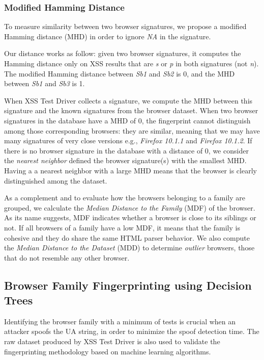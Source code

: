 \documentclass[10pt]{IEEEtran}
\begin{document}
\subsubsection{Modified Hamming Distance}


To measure similarity between two browser signatures, we propose a modified Hamming distance (MHD) 
in order to ignore \emph{NA} in the signature. 




Our distance works as follow: given two browser signatures, it computes the Hamming distance only on XSS results that are \emph{s} or \emph{p} in both signatures (not \emph{n}).
The modified Hamming distance between \emph{Sb1} and \emph{Sb2} is 0, and the MHD between \emph{Sb1} and \emph{Sb3} is 1.

When XSS Test Driver collects a signature,  we compute the MHD between this signature and the known signatures from the browser dataset. When two browser signatures in the database have a MHD of 0, the fingerprint cannot distinguish among those corresponding browsers: they are similar,
meaning that we may have many signatures of very close versions e.g., \emph{Firefox 10.1.1} and \emph{Firefox 10.1.2}. If there is no browser signature in  the database with a distance of 0, we consider the \emph{nearest neighbor} defined the browser signature(s) with the smallest MHD. Having a a nearest neighbor with a large MHD means that the browser is clearly distinguished among the dataset.

As a complement and to evaluate how the browsers belonging to a family are grouped, we calculate the \emph{Median Distance to the Family} (MDF) of the browser. As its name suggests, MDF indicates whether a browser is close to its siblings or not.
If all browsers of a family have a low MDF, it means that the family is cohesive and they do share the same HTML parser behavior.
We also compute the  \emph{Median Distance to the Dataset} (MDD) to determine 
\textit{outlier} browsers, those that do not resemble any other browser.


\subsection{Browser Family Fingerprinting using Decision Trees}
Identifying the browser family with a minimum of tests is crucial when an attacker
spoofs the UA string, in order to minimize the spoof detection time. 
The raw dataset produced by XSS Test Driver is also used to validate
the fingerprinting methodology based on machine learning algorithms. 
\end{document}
